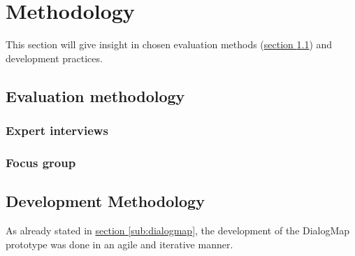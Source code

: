 \section{Methodology}
\label{chap:methodology}
This section will give insight in chosen evaluation methods (\hyperref[subchap:ev_methodology]{section \ref{subchap:ev_methodology}}) and development practices.

\subsection{Evaluation methodology}
\label{subchap:ev_methodology}

\subsubsection{Expert interviews}

\subsubsection{Focus group}

\subsection{Development Methodology}
As already stated in \hyperref[sub:dialogmap]{section \ref{sub:dialogmap}}, the development of the DialogMap prototype was done in an agile and iterative manner.